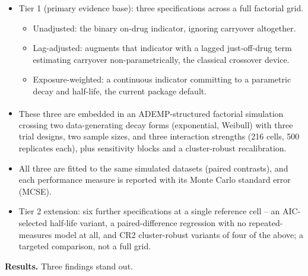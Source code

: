 \documentclass[
  11pt,
]{article}
\providecommand{\tightlist}{%
  \setlength{\itemsep}{0pt}\setlength{\parskip}{0pt}}
\begin{document}
\begin{itemize}
\tightlist
\item
  Tier 1 (primary evidence base): three specifications across a full
  factorial grid.

  \begin{itemize}
  \tightlist
  \item
    Unadjusted: the binary on-drug indicator, ignoring carryover
    altogether.
  \item
    Lag-adjusted: augments that indicator with a lagged just-off-drug
    term estimating carryover non-parametrically, the classical
    crossover device.
  \item
    Exposure-weighted: a continuous indicator committing to a
    parametric decay and half-life, the current package default.
  \end{itemize}
\item
  These three are embedded in an ADEMP-structured factorial
  simulation\textsuperscript{} crossing two data-generating
  decay forms (exponential, Weibull) with three trial designs, two
  sample sizes, and three interaction strengths (216 cells, 500
  replicates each), plus sensitivity blocks and a cluster-robust
  recalibration.
\item
  All three are fitted to the same simulated datasets (paired
  contrasts), and each performance measure is reported with its Monte
  Carlo standard error (MCSE).
\item
  Tier 2 extension: six further specifications at a single reference
  cell -- an AIC-selected half-life variant, a paired-difference
  regression with no repeated-measures model at all, and CR2
  cluster-robust variants of four of the above; a targeted comparison,
  not a full grid.
\end{itemize}

\textbf{Results.} Three findings stand out.
\end{document}
